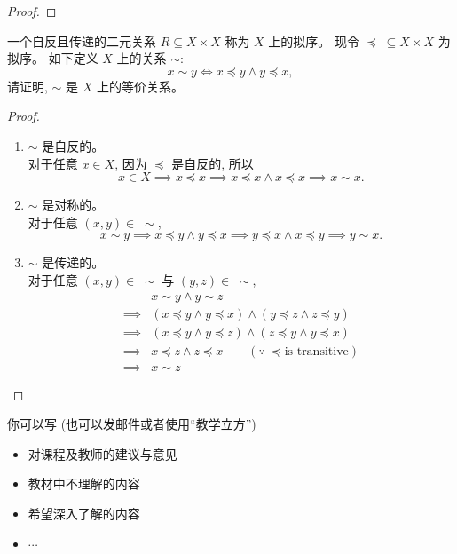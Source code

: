 \documentclass[a4paper, justified]{tufte-handout}
\begin{document}
\begin{proof}
\end{proof}

\begin{problem}
  一个自反且传递的二元关系 $R \subseteq X \times X$
  称为 $X$ 上的拟序。
  现令 $\preceq\; \subseteq X \times X$ 为拟序。
  如下定义 $X$ 上的关系 $\sim$:
  \[
    x \sim y \iff x \preceq y \land y \preceq x,
  \]
  请证明, $\sim$ 是 $X$ 上的等价关系。
\end{problem}

\begin{proof}
  \begin{enumerate}[(1)]
    \item $\sim$ 是自反的。\\
      对于任意 $x \in X$, 因为 $\preceq$ 是自反的, 所以
      \[
        x \in X \implies x \preceq x \implies x \preceq x \land x \preceq x
        \implies x \sim x.
      \]
    \item $\sim$ 是对称的。\\
      对于任意 $(x, y) \in \;\sim$,
      \[
        x \sim y \implies x \preceq y \land y \preceq x
        \implies y \preceq x \land x \preceq y \implies y \sim x.
      \]
    \item $\sim$ 是传递的。\\
      对于任意 $(x, y) \in \;\sim$ 与 $(y, z) \in \;\sim$,
      \begin{align*}
        & x \sim y \land y \sim z \\[6pt]
        \implies & (x \preceq y \land y \preceq x) \land (y \preceq z \land z \preceq y) \\[6pt]
        \implies & (x \preceq y \land y \preceq z) \land (z \preceq y \land y \preceq x) \\[6pt]
        \implies & x \preceq z \land z \preceq x \qquad (\because \;\preceq \text{is transitive})\\[6pt]
        \implies & x \sim z
      \end{align*}
  \end{enumerate}
\end{proof}

\begincorrection

\beginfb

你可以写 (也可以发邮件或者使用``教学立方'')
\begin{itemize}
  \item 对课程及教师的建议与意见
  \item 教材中不理解的内容
  \item 希望深入了解的内容
  \item $\cdots$
\end{itemize}
\end{document}
